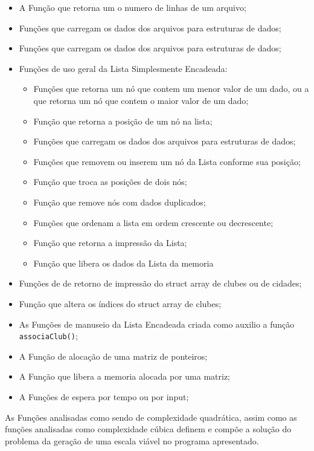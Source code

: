 \documentclass[12pt,a4paper]{article}
\begin{document}
\begin{itemize}
	\setlength\itemsep{1pt}
	\item A Função que retorna um o numero de linhas de um arquivo;
	\item Funções que carregam os dados dos arquivos para estruturas de dados;
	\item Funções que carregam os dados dos arquivos para estruturas de dados;
	\item Funções de uso geral da Lista Simplesmente Encadeada:
	\begin{itemize}
		\setlength\itemsep{1pt}
		\item Funções que retorna um nó que contem um menor valor de um dado, ou a que retorna um nó que contem o maior valor de um dado;
		\item Função que retorna a posição de um nó na lista;
		\item Funções que carregam os dados dos arquivos para estruturas de dados;
		\item Funções que removem ou inserem um nó da Lista conforme sua posição;
		\item Função que troca as posições de dois nós;
		\item Função que remove nós com dados duplicados;
		\item Funções que ordenam a lista em ordem crescente ou decrescente;
		\item Função que retorna a impressão da Lista;
		\item Função que libera os dados da Lista da memoria
	\end{itemize}
	\item Funções de de retorno de impressão do struct array de clubes ou de cidades;
	\item Função que altera os índices do struct array de clubes;
	\item As Funções de manuseio da Lista Encadeada criada como auxilio a função\\ \texttt{associaClub()};
	\item A Função de alocação de uma matriz de ponteiros;
	\item A Função que libera a memoria alocada por uma matriz;
	\item A Funções de espera por tempo ou por input;
\end{itemize}

As Funções analisadas como sendo de complexidade quadrática, assim como as funções analisadas como complexidade cúbica definem e compõe a solução do problema da geração de uma escala viável no programa apresentado. 
\end{document}
